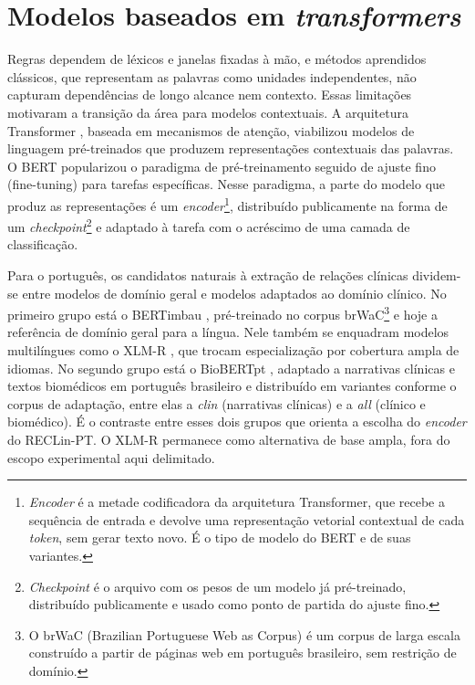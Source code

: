 \section{Modelos baseados em \emph{transformers}}

Regras dependem de léxicos e janelas fixadas à mão, e métodos aprendidos clássicos,
que representam as palavras como unidades independentes, não capturam dependências
de longo alcance nem contexto. Essas limitações motivaram a transição da área para
modelos contextuais. A arquitetura \foreignlanguage{english}{Transformer}
\cite{vaswani_2017_attention}, baseada em mecanismos de atenção, viabilizou modelos
de linguagem pré-treinados que produzem representações contextuais das palavras. O
BERT \cite{devlin_2019_bert} popularizou o paradigma de pré-treinamento seguido de
ajuste fino (\foreignlanguage{english}{fine-tuning}) para tarefas específicas. Nesse
paradigma, a parte do modelo que produz as representações é um
\emph{encoder}\footnote{\emph{Encoder} é a metade codificadora da arquitetura
\foreignlanguage{english}{Transformer}, que recebe a sequência de entrada e devolve
uma representação vetorial contextual de cada \emph{token}, sem gerar texto novo. É o
tipo de modelo do BERT e de suas variantes.}, distribuído publicamente na forma de um
\emph{checkpoint}\footnote{\emph{Checkpoint} é o arquivo com os pesos de um modelo já
pré-treinado, distribuído publicamente e usado como ponto de partida do ajuste fino.}
e adaptado à tarefa com o acréscimo de uma camada de classificação.

Para o português, os candidatos naturais à extração de relações clínicas dividem-se
entre modelos de domínio geral e modelos adaptados ao domínio clínico. No primeiro
grupo está o BERTimbau \cite{souza_2020_bertimbau}, pré-treinado no corpus
brWaC\footnote{O brWaC (\foreignlanguage{english}{Brazilian Portuguese Web as
Corpus}) é um corpus de larga escala construído a partir de páginas web em português
brasileiro, sem restrição de domínio.} e hoje a referência de domínio geral para a
língua. Nele também se enquadram modelos multilíngues como o XLM-R
\cite{conneau_2020_xlmr}, que trocam especialização por cobertura ampla de idiomas.
No segundo grupo está o BioBERTpt \cite{schneider_2020_biobertpt},
adaptado a narrativas clínicas e textos biomédicos em português brasileiro e
distribuído em variantes conforme o corpus de adaptação, entre elas a
\emph{clin} (narrativas clínicas) e a \emph{all} (clínico e biomédico). É o
contraste entre esses dois grupos que orienta a escolha do \emph{encoder} do
RECLin-PT. O XLM-R permanece como alternativa de base ampla, fora do escopo
experimental aqui delimitado.


